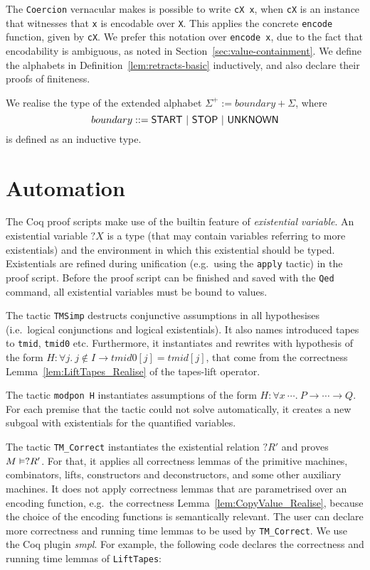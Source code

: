 The \lstinline!Coercion! vernacular makes is possible to write \lstinline!cX x!, when \lstinline!cX! is an instance that witnesses that \lstinline!x!
is encodable over \lstinline!X!.  This applies the concrete \lstinline!encode! function, given by \lstinline!cX!.  We prefer this notation over
\lstinline!encode x!, due to the fact that encodability is ambiguous, as noted in Section~\ref{sec:value-containment}.  We define the alphabets in
Definition~\ref{lem:retracts-basic} inductively, and also declare their proofs of finiteness.

We realise the type of the extended alphabet $\Sigma^+ := boundary + \Sigma$, where
\[ boundary ::= \mathsf{START} ~|~ \mathsf{STOP} ~|~ \mathsf{UNKNOWN} \]%
is defined as an inductive type.


\section*{Automation}
\label{sec:coq-automation}

The Coq proof scripts make use of the builtin feature of \textit{existential variable}.  An existential variable $?X$ is a type (that may contain
variables referring to more existentials) and the environment in which this existential should be typed.  Existentials are refined during unification
(e.g.\ using the \lstinline!apply! tactic) in the proof script.  Before the proof script can be finished and saved with the \lstinline!Qed! command,
all existential variables must be bound to values.

The tactic \lstinline!TMSimp! destructs conjunctive assumptions in all hypothesises (i.e.\ logical conjunctions and logical existentials).  It also
names introduced tapes to \lstinline!tmid!, \lstinline!tmid0! etc.  Furthermore, it instantiates and rewrites with hypothesis of the form
$H: \forall j.~ j \notin I \rightarrow tmid0[j] = tmid[j]$, that come from the correctness Lemma~\ref{lem:LiftTapes_Realise} of the tapes-lift
operator.

The tactic \lstinline!modpon H! instantiates assumptions of the form $H: \forall x~\cdots.~P \rightarrow \cdots \rightarrow Q$.  For each premise that
the tactic could not solve automatically, it creates a new subgoal with existentials for the quantified variables.

The tactic \lstinline!TM_Correct! instantiates the existential relation $?R'$ and proves $M \mathrel{\vDash} ?R'$.  For that, it applies all correctness
lemmas of the primitive machines, combinators, lifts, constructors and deconstructors, and some other auxiliary machines.  It does not apply
correctness lemmas that are parametrised over an encoding function, e.g.\ the correctness Lemma~\ref{lem:CopyValue_Realise}, because the choice of the
encoding functions is semantically relevant.  The user can declare more correctness and running time lemmas to be used by \lstinline!TM_Correct!.  We
use the Coq plugin \textit{smpl}.  For example, the following code declares the correctness and running time lemmas of \lstinline!LiftTapes!:

